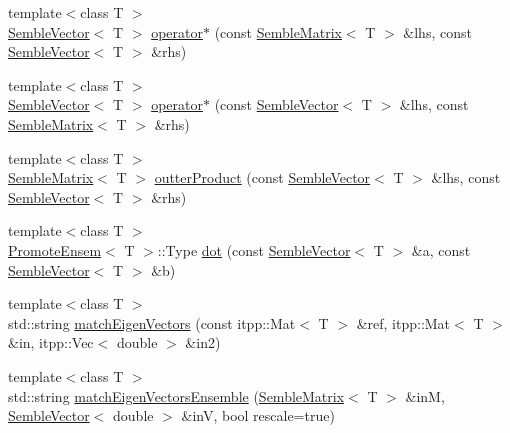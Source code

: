 \begin{DoxyCompactItemize}
\item 
{\footnotesize template$<$class T $>$ }\\\mbox{\hyperlink{structSEMBLE_1_1SembleVector}{Semble\+Vector}}$<$ T $>$ \mbox{\hyperlink{namespaceSEMBLE_a80661aa291e6013de69fcc09abfffe9d}{operator$\ast$}} (const \mbox{\hyperlink{structSEMBLE_1_1SembleMatrix}{Semble\+Matrix}}$<$ T $>$ \&lhs, const \mbox{\hyperlink{structSEMBLE_1_1SembleVector}{Semble\+Vector}}$<$ T $>$ \&rhs)
\item 
{\footnotesize template$<$class T $>$ }\\\mbox{\hyperlink{structSEMBLE_1_1SembleVector}{Semble\+Vector}}$<$ T $>$ \mbox{\hyperlink{namespaceSEMBLE_af35047ebae6e7da46390a840ba9d2440}{operator$\ast$}} (const \mbox{\hyperlink{structSEMBLE_1_1SembleVector}{Semble\+Vector}}$<$ T $>$ \&lhs, const \mbox{\hyperlink{structSEMBLE_1_1SembleMatrix}{Semble\+Matrix}}$<$ T $>$ \&rhs)
\item 
{\footnotesize template$<$class T $>$ }\\\mbox{\hyperlink{structSEMBLE_1_1SembleMatrix}{Semble\+Matrix}}$<$ T $>$ \mbox{\hyperlink{namespaceSEMBLE_a2d350ec19bb9d35ba9a92cc043a06a95}{outter\+Product}} (const \mbox{\hyperlink{structSEMBLE_1_1SembleVector}{Semble\+Vector}}$<$ T $>$ \&lhs, const \mbox{\hyperlink{structSEMBLE_1_1SembleVector}{Semble\+Vector}}$<$ T $>$ \&rhs)
\item 
{\footnotesize template$<$class T $>$ }\\\mbox{\hyperlink{structSEMBLE_1_1PromoteEnsem}{Promote\+Ensem}}$<$ T $>$\+::Type \mbox{\hyperlink{namespaceSEMBLE_ad2d1d3576d6f13834bc55793e8c940e0}{dot}} (const \mbox{\hyperlink{structSEMBLE_1_1SembleVector}{Semble\+Vector}}$<$ T $>$ \&a, const \mbox{\hyperlink{structSEMBLE_1_1SembleVector}{Semble\+Vector}}$<$ T $>$ \&b)
\item 
{\footnotesize template$<$class T $>$ }\\std\+::string \mbox{\hyperlink{namespaceSEMBLE_a7e0af5033a46ccd68accbec344be1f4e}{match\+Eigen\+Vectors}} (const itpp\+::\+Mat$<$ T $>$ \&ref, itpp\+::\+Mat$<$ T $>$ \&in, itpp\+::\+Vec$<$ double $>$ \&in2)
\item 
{\footnotesize template$<$class T $>$ }\\std\+::string \mbox{\hyperlink{namespaceSEMBLE_ad0d009c5dcbf4da0e2270b14f667ee70}{match\+Eigen\+Vectors\+Ensemble}} (\mbox{\hyperlink{structSEMBLE_1_1SembleMatrix}{Semble\+Matrix}}$<$ T $>$ \&inM, \mbox{\hyperlink{structSEMBLE_1_1SembleVector}{Semble\+Vector}}$<$ double $>$ \&inV, bool rescale=true)
\item 

\end{DoxyCompactItemize}

